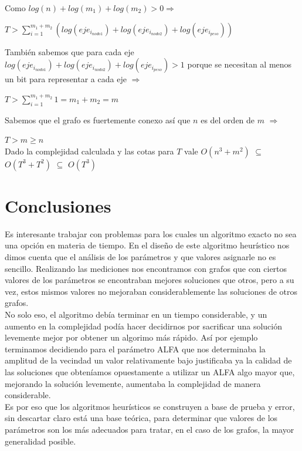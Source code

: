\documentclass[11pt, a4paper, spanish]{article}
\begin{document}
	\noindent Como $log(n) + log(m_{1}) + log(m_{2}) > 0 \Rightarrow$
	\begin{center}
	$T > \displaystyle\sum_{i=1}^{m_{1} + m_{2}}{(log(eje_{i_{nodo1}})+log(eje_{i_{nodo2}}) + log(eje_{i_{peso}}))}$\\
	\end{center}

	\noindent Tambi\'en sabemos que para cada eje $log(eje_{i_{nodo1}})+log(eje_{i_{nodo2}}) + log(eje_{i_{peso}}) > 1$ porque se necesitan al menos un bit para representar a cada eje $\Rightarrow$\\
	\begin{center}
	$T > \displaystyle\sum_{i=1}^{m_{1} + m_{2}}{1} = m_{1} + m_{2} = m$ \\
	\end{center}
	Sabemos que el grafo es fuertemente conexo as\'i que $n$ es del orden de $m$ $\Rightarrow$

	\begin{center}
	$T > m \geq n$ \\
	Dado la complejidad calculada y las cotas para $T$ vale $O(n^{3} + m^{2})$ $\subseteq$ $O(T^{3}+T^{2})$ $\subseteq$ $O(T^{3})$
	\end{center}
\newpage


\section{Conclusiones}

	Es interesante trabajar con problemas para los cuales un algoritmo exacto no sea una opci\'on en materia de tiempo. En el dise\~{n}o de este algoritmo heur\'istico nos dimos cuenta que el an\'alisis de los par\'ametros y que valores asignarle no es sencillo. Realizando las mediciones nos encontramos con grafos que con ciertos valores de los parámetros se encontraban mejores soluciones que otros, pero a su vez, estos mismos valores no mejoraban considerablemente las soluciones de otros grafos.\\

No solo eso, el algoritmo deb\'ia terminar en un tiempo considerable, y un aumento en la complejidad pod\'ia hacer decidirnos por sacrificar una soluci\'on levemente mejor por obtener un algorimo m\'as r\'apido. As\'i por ejemplo terminamos decidiendo para el par\'ametro ALFA que nos determinaba la amplitud de la vecindad un valor relativamente bajo justificaba ya la calidad de las soluciones que obten\'iamos opuestamente a utilizar un ALFA algo mayor que, mejorando la soluci\'on levemente, aumentaba la complejidad de manera considerable.\\

Es por eso que los algoritmos heur\'isticos se construyen a base de prueba y error, sin descartar claro est\'a una base te\'orica, para determinar que valores de los par\'ametros son los m\'as adecuados para tratar, en el caso de los grafos, la mayor generalidad posible. 
\end{document}
